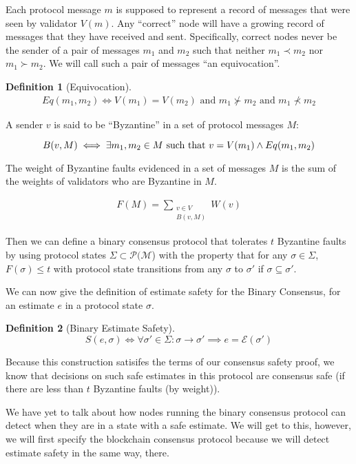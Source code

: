 \documentclass{article}
\theoremstyle{definition}
\newtheorem{defn}{Definition}[section]
\begin{document}
Each protocol message $m$ is supposed to represent a record of messages that were seen by validator $V(m)$. Any ``correct'' node will have a growing record of messages that they have received and sent. Specifically, correct nodes never be the sender of a pair of messages $m_1$ and $m_2$ such that neither $m_1 \prec m_2$ nor $m_1 \succ m_2$. We will call such a pair of messages ``an equivocation''.


\begin{defn}[Equivocation]
\begin{align}
Eq(m_1, m_2) \iff V(m_1) = V(m_2) \text{ and } m_1 \nsucc m_2 \text{ and } m_1 \nprec m_2
\end{align}
\end{defn}

A sender $v$ is said to be ``Byzantine'' in a set of protocol messages $M$:

$$
B(v,M) \iff \exists m_1, m_2 \in M \text{ such that } \\ v = V(m_1) \land Eq(m_1, m_2)
$$

The weight of Byzantine faults evidenced in a set of messages $M$ is the sum of the weights of validators who are Byzantine in $M$.

\begin{align}
F(M) = \sum_{\substack{v \in V \\ B(v, M)}} W(v)
\end{align}

Then we can define a binary consensus protocol that tolerates $t$ Byzantine faults by using protocol states $\Sigma \subset \mathcal{P}(\mathcal{M}$) with the property that for any $\sigma \in \Sigma$, $F(\sigma) \leq t$ with protocol state transitions from any $\sigma$ to $\sigma'$ if $\sigma \subseteq \sigma'$. 

We can now give the definition of estimate safety for the Binary Consensus, for an estimate $e$ in a protocol state $\sigma$.

\begin{defn}[Binary Estimate Safety]
$$
S(e, \sigma) \iff \forall \sigma' \in \Sigma: \sigma \to \sigma' \implies e = \mathcal{E}(\sigma')
$$
\end{defn}

Because this construction satisifes the terms of our consensus safety proof, we know that decisions on such safe estimates in this protocol are consensus safe (if there are less than $t$ Byzantine faults (by weight)).

We have yet to talk about how nodes running the binary consensus protocol can detect when they are in a state with a safe estimate. We will get to this, however, we will first specify the blockchain consensus protocol because we will detect estimate safety in the same way, there.
\end{document}
